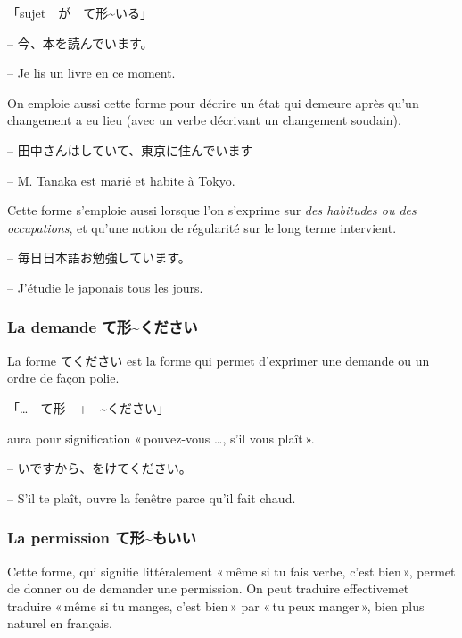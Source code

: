 \begin{center}
    「sujet　が　て形\~{}いる」
\end{center}

\begin{tcolorbox}
    -- 今、本を読んでいます。

    -- Je lis un livre en ce moment.
\end{tcolorbox}

On emploie aussi cette forme pour décrire un état qui demeure après qu'un changement a eu lieu (avec un verbe décrivant un changement soudain).

\begin{tcolorbox}
    -- 田中さんはしていて、東京に住んでいます

    -- M. Tanaka est marié et habite à Tokyo.
\end{tcolorbox}

Cette forme s'emploie aussi lorsque l'on s'exprime sur \textit{des habitudes ou des occupations}, et qu'une notion de régularité sur le long terme intervient.

\begin{tcolorbox}
    -- 毎日日本語お勉強しています。

    -- J'étudie le japonais tous les jours.
\end{tcolorbox}

\subsubsection{La demande て形\~{}ください}

La forme てください est la forme qui permet d'exprimer une demande ou un ordre de façon polie.
\begin{center}
    「\dots　て形　+　\~{}ください」
\end{center}
aura pour signification « pouvez-vous \dots, s'il vous plaît ».
\begin{tcolorbox}
    -- いですから、をけてください。

    -- S'il te plaît, ouvre la fenêtre parce qu'il fait chaud.
\end{tcolorbox}

\subsubsection{La permission て形\~{}もいい}

Cette forme, qui signifie littéralement « même si tu fais verbe, c'est bien », permet de donner ou de demander une permission. On peut traduire effectivemet traduire « même si tu manges, c'est bien » par « tu peux manger », bien plus naturel en français.

